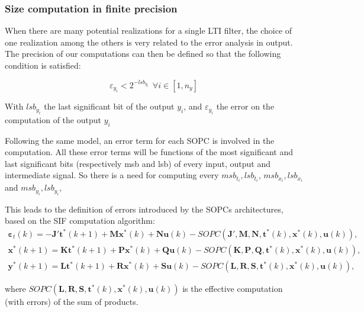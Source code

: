 	\subsubsection{Size computation in finite precision}
	When there are many potential realizations for a single LTI filter, the choice of one realization
	among the others is very related to the error analysis in output.
	The precision of our computations can then be defined so that the following condition is satisfied:

	\begin{equation} \label{condition}
		\varepsilon_{y_i} < 2^{-lsb_{y_i}} \hspace{5pt} \forall i \in [1,n_y]
	\end{equation}

	With $lsb_{y_i}$ the last significant bit of the output $y_i$, and $\varepsilon_{y_i}$ the error on the computation of the output $y_i$

	Following the same model, an error term for each SOPC is involved in the computation.
	All these error terms will be functions of the most significant and last significant bits (respectively msb and lsb) of every input, output and intermediate signal.
	So there is a need for computing every ${msb_{t_i},lsb_{t_i}}$, ${msb_{x_i},lsb_{x_i}}$ and ${msb_{y_i},lsb_{y_i}}$,

	This leads to the definition of errors introduced by the SOPCs architectures, based on the SIF computation algorithm:
		\begin{eqnarray}
				\boldsymbol{\varepsilon}_t(k) =
				- \boldsymbol{J'}\boldsymbol{t}^*(k+1) 
				+ \boldsymbol{M} \boldsymbol{x}^*(k) 
				+ \boldsymbol{N} \boldsymbol{u}(k) 
				- SOPC(\boldsymbol{J'}, \boldsymbol{M}, \boldsymbol{N}, \boldsymbol{t}^*(k), \boldsymbol{x}^*(k), \boldsymbol{u}(k)),\\
				\boldsymbol{x}^*(k+1) =
				\boldsymbol{K}\boldsymbol{t}^*(k+1)
				+ \boldsymbol{P} \boldsymbol{x}^*(k)
				+ \boldsymbol{Q} \boldsymbol{u}(k)
				- SOPC(\boldsymbol{K}, \boldsymbol{P}, \boldsymbol{Q}, \boldsymbol{t}^*(k), \boldsymbol{x}^*(k), \boldsymbol{u}(k)),\\
				\boldsymbol{y}^*(k+1) =
				\boldsymbol{L}\boldsymbol{t}^*(k+1)
				+ \boldsymbol{R} \boldsymbol{x}^*(k)
				+ \boldsymbol{S} \boldsymbol{u}(k)
				- SOPC(\boldsymbol{L}, \boldsymbol{R}, \boldsymbol{S}, \boldsymbol{t}^*(k), \boldsymbol{x}^*(k), \boldsymbol{u}(k)),
		\end{eqnarray}

		where
		$SOPC(\boldsymbol{L}, \boldsymbol{R}, \boldsymbol{S}, \boldsymbol{t}^*(k), \boldsymbol{x}^*(k), \boldsymbol{u}(k))$
		is the effective computation (with errors) of the sum of products.


